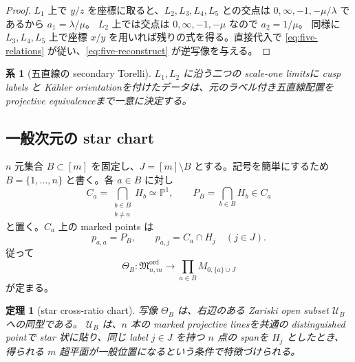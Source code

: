 \documentclass[11pt,a4paper]{ltjsarticle}
\newcommand{\PP}{\mathbb P}
\newcommand{\cU}{\mathcal U}
\newcommand{\Mord}{\mathfrak M^{\mathrm{ord}}}
\theoremstyle{plain}
\newtheorem{theorem}{定理}[section]
\newtheorem{corollary}[corollary]{系}
\theoremstyle{definition}
\theoremstyle{remark}
\begin{document}
\begin{proof}
$L_1$ 上で $y/z$ を座標に取ると、$L_2,L_3,L_4,L_5$ との交点は
$0,\infty,-1,-\mu/\lambda$ であるから $a_1=\lambda/\mu$。
$L_2$ 上では交点は $0,\infty,-1,-\mu$ なので $a_2=1/\mu$。
同様に $L_3,L_4,L_5$ 上で座標 $x/y$ を用いれば残りの式を得る。直接代入で \eqref{eq:five-relations} が従い、\eqref{eq:five-reconstruct} が逆写像を与える。
\end{proof}

\begin{corollary}[五直線の secondary Torelli]
$L_1,L_2$ に沿う二つの scale-one limitsに cusp labels と K\"ahler orientationを付けたデータは、元のラベル付き五直線配置を projective equivalenceまで一意に決定する。
\end{corollary}

\subsection{一般次元の star chart}
$n$ 元集合 $B\subset[m]$ を固定し、$J=[m]\setminus B$ とする。記号を簡単にするため $B=\{1,\ldots,n\}$ と書く。各 $a\in B$ に対し
\begin{equation}
\label{eq:starcurves}
 C_a=\bigcap_{\substack{b\in B\\b\ne a}}H_b\simeq\PP^1,
 \qquad
 P_B=\bigcap_{b\in B}H_b\in C_a
\end{equation}
と置く。$C_a$ 上の marked points は
\[
 p_{a,a}=P_B,
 \qquad p_{a,j}=C_a\cap H_j\quad(j\in J).
\]
従って
\begin{equation}
\label{eq:ThetaB}
 \Theta_B:\Mord_{n,m}\longrightarrow
 \prod_{a\in B}M_{0,\{a\}\cup J}
\end{equation}
が定まる。

\begin{theorem}[star cross-ratio chart]
\label{thm:star-chart}
写像 $\Theta_B$ は、右辺のある Zariski open subset $\cU_B$ への同型である。
$\cU_B$ は、$n$ 本の marked projective linesを共通の distinguished pointで star 状に貼り、同じ label $j\in J$ を持つ $n$ 点の spanを $H_j$ としたとき、得られる $m$ 超平面が一般位置になるという条件で特徴づけられる。
\end{theorem}
\end{document}
